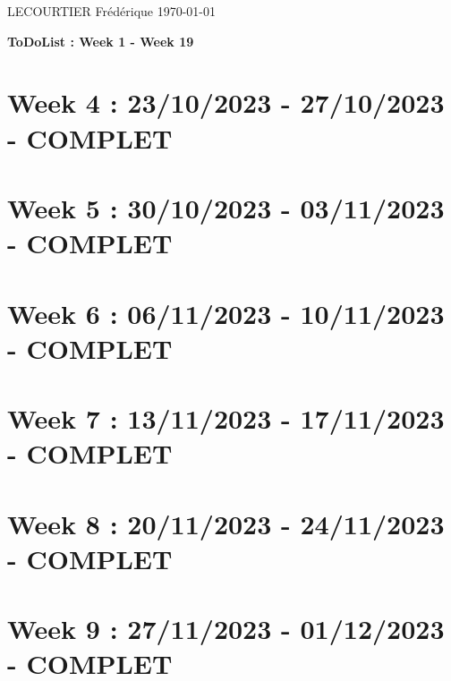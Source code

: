 \documentclass{article}
\begin{document}
	LECOURTIER Frédérique \hfill \today
	\begin{center}
		\Large\textbf{{ToDoList : Week 1 - Week 19}}
	\end{center}
	\tableofcontents

	\newpage

	\section*{Week 4 : 23/10/2023 - 27/10/2023 - COMPLET}
	

	\newpage

	\section*{Week 5 : 30/10/2023 - 03/11/2023 - COMPLET}
	

	\newpage

	\section*{Week 6 : 06/11/2023 - 10/11/2023 - COMPLET}
	

	\newpage

	\section*{Week 7 : 13/11/2023 - 17/11/2023 - COMPLET}
	

	\newpage

	\section*{Week 8 : 20/11/2023 - 24/11/2023 - COMPLET}
	

	\newpage

	\section*{Week 9 : 27/11/2023 - 01/12/2023 - COMPLET}
	
\end{document}
